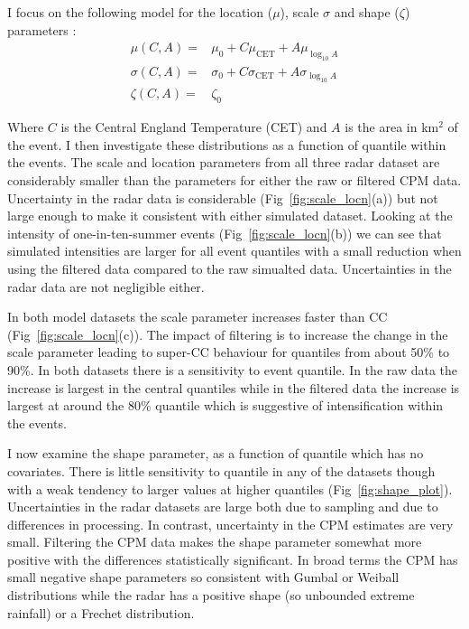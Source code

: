 \documentclass[11pt,a4paper]{article}
\begin{document}
I focus on the following  model for the location ($\mu$), scale $\sigma$ and shape ($\zeta$) parameters :
\begin{align}
	\mu(C,A) =& \mu_0 + C\mu_\text{CET}+A\mu_{\log_{10}A} \\
	 \sigma(C,A) =& \sigma_0 +C\sigma_\text{CET}+A\sigma_{\log_{10}A}\\
	 \zeta(C,A)=&\zeta_0
\end{align}

Where $C$ is the Central England Temperature (CET) and $A$ is the area in km$^2$ of the event.  I then investigate these distributions as a function of quantile within the events.  The scale and location parameters from all three radar dataset are considerably smaller than the parameters for either the raw or filtered CPM data. Uncertainty in the radar data is considerable (Fig~\ref{fig:scale_locn}(a)) but not large enough to make it consistent with either simulated dataset.  Looking at the intensity of one-in-ten-summer events (Fig~\ref{fig:scale_locn}(b)) we can see that simulated intensities are larger for all event quantiles with a small reduction when using the filtered data compared to the raw simualted data. Uncertainties in the radar data are not  negligible either. 

In both model datasets the scale parameter increases faster than CC (Fig~\ref{fig:scale_locn}(c)). The impact of filtering is to increase the change in the scale parameter leading to super-CC behaviour for quantiles from about 50\% to 90\%.  In both datasets there is a sensitivity to event quantile. In the raw data the increase is largest in the central quantiles while in the filtered data the increase is largest at around the 80\% quantile which is suggestive of intensification within the events. 

I now examine the shape parameter, as a function of quantile which  has no covariates.  There is little sensitivity to quantile in any of the datasets though with a weak tendency to larger values at higher quantiles (Fig~\ref{fig:shape_plot}).  Uncertainties in the radar datasets are large both due to sampling and due to differences in processing. In contrast, uncertainty in the CPM estimates are very small. Filtering the CPM data makes the shape parameter somewhat more positive with the differences statistically significant. In broad terms the CPM has small negative  shape parameters so consistent with Gumbal or Weiball distributions while the radar has a positive shape (so unbounded extreme rainfall)  or a Frechet distribution. 
\end{document}
